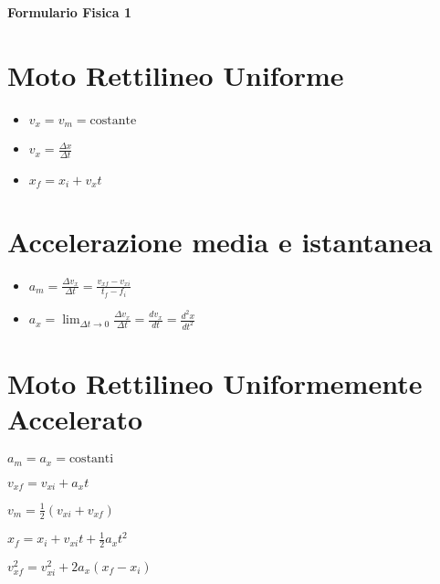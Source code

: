\documentclass[a4paper,14pt,landscape]{extarticle}
\title{}
\author{}
\date{}
\begin{document}
\begin{center}
    \vspace{1cm}
    \textbf{\Large Formulario Fisica 1}
    \vspace{1cm}
\end{center}

\begin{multicols*}{2}
    \section*{Moto Rettilineo Uniforme}
    \begin{itemize}
        \item $v_x = v_m = \text{costante}$
        \item $v_x = \frac{\Delta x}{\Delta t}$
        \item $x_f = x_i + v_x t$
    \end{itemize}

    \section*{Accelerazione media e istantanea}
    \begin{itemize}
        \item $a_m = \frac{\Delta v_x}{\Delta t} = \frac{v_{xf} - v_{xi}}{t_{f} - f_{i}}$
        \item $a_x = \displaystyle\lim_{\Delta t \to 0} \frac{\Delta v_x}{\Delta t} = \frac{dv_x}{dt} = \frac{d^2 x}{dt^2}$
    \end{itemize}

    \section*{Moto Rettilineo Uniformemente Accelerato}
    \begin{itemize}
        \begin{multicols*}{2}
            \item $a_m = a_x = \text{costanti}$
            \item $v_{xf} = v_{xi} + a_x t$
            \item $v_m = \tfrac{1}{2} (v_{xi} + v_{xf})$
            \item $x_f = x_i + v_{xi}t + \tfrac{1}{2} a_x t^2$
            \item $v^2_{xf} = v^2_{xi} + 2a_x(x_f - x_i)$
        \end{multicols*}
    \end{itemize}


\end{multicols*}
\end{document}
